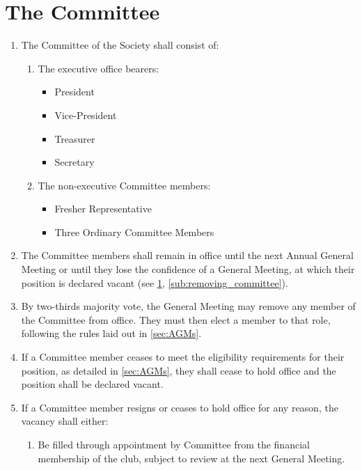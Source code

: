 \documentclass[a4paper]{article}
\begin{document}
\section{The Committee} \label{sec:committee}
\begin{enumerate}
	\item The Committee of the Society shall consist of:
    \begin{enumerate}
    	\item The executive office bearers:
        \begin{itemize}
          \item President
          \item Vice-President
          \item Treasurer
          \item Secretary 
        \end{itemize}
        \item The non-executive Committee members:
        \begin{itemize}
            \item Fresher Representative
        	\item Three Ordinary Committee Members
        \end{itemize}
    \end{enumerate}
    \item The Committee members shall remain in office until the next Annual General Meeting or until they lose the confidence of a General Meeting, at which their position is declared vacant (see \cref{sec:committee}, \cref{sub:removing_committee}).
    \item \label{sub:removing_committee} By two-thirds majority vote, the General Meeting may remove any member of the Committee from office. They must then elect a member to that role, following the rules laid out in \cref{sec:AGMs}.
    \item If a Committee member ceases to meet the eligibility requirements for their position, as detailed in \cref{sec:AGMs}, they shall cease to hold office and the position shall be declared vacant.
    \item \label{sub:committee_resign} If a Committee member resigns or ceases to hold office for any reason, the vacancy shall either:
    \begin{enumerate}
        \item Be filled through appointment by Committee from the financial membership of the club, subject to review at the next General Meeting.
        \begin{enumerate}

\end{enumerate}
\end{enumerate}
\end{enumerate}
\end{document}
